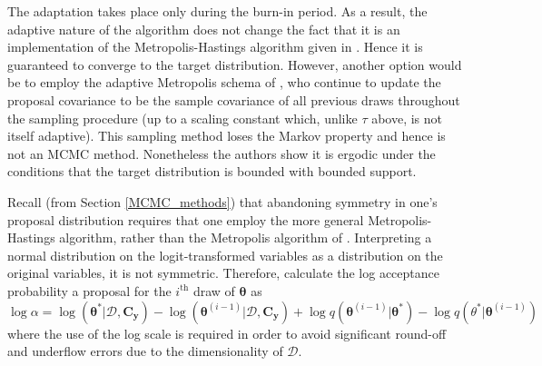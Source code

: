 \documentclass{article}
\begin{document}

The adaptation takes place only during the burn-in period. 
As a result, the adaptive nature of the algorithm does not change the fact that it is an implementation of the Metropolis-Hastings algorithm given in \cite{Hastings1970}. Hence it is guaranteed to converge to the target distribution. 
However, another option would be to employ the adaptive Metropolis schema of \cite{Haario2001,Haario2005,Haario2006}, who continue to update the proposal covariance to be the sample covariance of all previous draws throughout the sampling procedure (up to a scaling constant which, unlike $\tau$ above, is not itself adaptive). This sampling method loses the Markov property and hence is not an MCMC method. 
Nonetheless the authors show it is ergodic under the conditions that the target distribution is bounded with bounded support. 

Recall (from Section \ref{MCMC_methods}) that abandoning symmetry in one's proposal distribution requires that one employ the more general Metropolis-Hastings algorithm, rather than the Metropolis algorithm of \cite{Metropolis1953}. Interpreting a normal distribution on the logit-transformed variables as a distribution on the original variables, it is not symmetric. Therefore, calculate the log acceptance probability a proposal for the $i^{\text{th}}$ draw of $\boldsymbol \theta$ as 
\begin{equation}
\log \alpha = \log(\boldsymbol \theta^*|\mathcal D, \mathbf C_{\mathbf y}) - \log(\boldsymbol \theta^{(i-1)}|\mathcal D,\mathbf C_{\mathbf y}) + \log q(\boldsymbol \theta^{(i-1)}|\boldsymbol \theta^*)
- \log q(\theta^* |\boldsymbol \theta^{(i-1)})
\end{equation}
where the use of the log scale is required in order to avoid significant round-off and underflow errors due to the dimensionality of $\mathcal D$.
\end{document}
